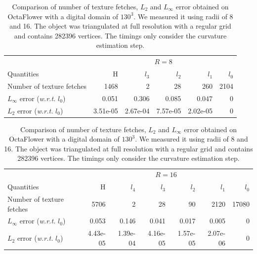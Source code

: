 \documentclass{llncs}
\newcommand{\wrt}{\emph{w.r.t.} }
\begin{document}
\begin{table}
  \begin{center}

	\begin{tabular}{@{}lrrrrr@{}}
      \toprule
      & \multicolumn{5}{c}{$R=8$}\\
      \cmidrule(r){2-6}
    Quantities & ~~~H & $l_3$ & $l_2$ & $l_1$ & $l_0$\\
      \midrule
      Number of texture fetches &
      1468 & 2 & 28 & 260 & 2104\\
      $L_\infty$ error (\wrt $l_0$) &
      0.051 & 0.306 & 0.085 & 0.047 & 0\\
      $L_2$ error (\wrt $l_0$) &
      3.51e-05 & 2.67e-04 & 7.57e-05 & 2.02e-05 & 0\\
      \bottomrule
    \end{tabular}

	\begin{tabular}{@{}lrrrrrr@{}}
      \toprule
      & \multicolumn{6}{c}{$R=16$}\\
      \cmidrule(r){2-7}
    Quantities & ~~~H & $l_4$ & $l_3$ & $l_2$ & $l_1$ & $l_0$\\
      \midrule
      Number of texture fetches &
      5706 & 2 & 28 & 90 & 2120 & 17080\\
      $L_\infty$ error (\wrt $l_0$) &
      0.053 & 0.146 & 0.041 & 0.017 & 0.005 & 0\\
      $L_2$ error (\wrt $l_0$) &
      4.43e-05 & 1.39e-04 & 4.16e-05 & 1.57e-05 & 2.07e-06 & 0\\
      \bottomrule
    \end{tabular}

  \end{center}
  \caption{Comparison of number of texture fetches, $L_2$ and $L_\infty$ error obtained on OctaFlower with a digital domain of $130^3$. We measured it using radii of 8 and 16.
  The object was triangulated at full resolution with a regular grid and contains 282396 vertices. The timings
    only consider the curvature estimation step.\label{tab:full-res-stat}}
\end{table}
\end{document}
